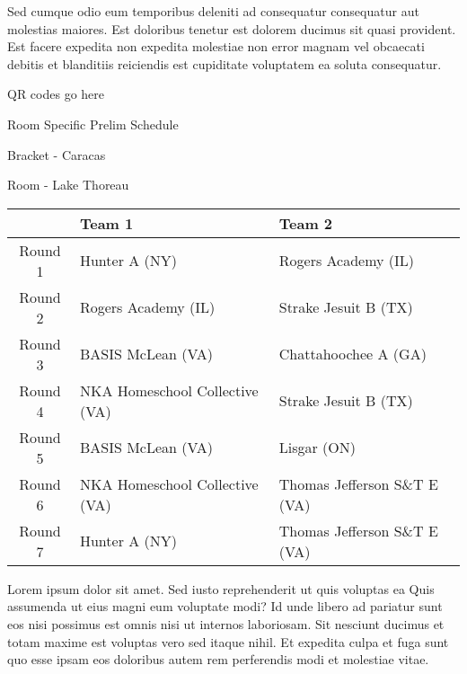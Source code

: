 \documentclass{article}%
\begin{document}
\newline%
Sed cumque odio eum temporibus deleniti ad consequatur consequatur aut molestias maiores. Est doloribus tenetur est dolorem ducimus sit quasi provident. Est facere expedita non expedita molestiae non error magnam vel obcaecati debitis et blanditiis reiciendis est cupiditate voluptatem ea soluta consequatur.%
\vspace*{140pt}%
\begin{center}%
\begin{Huge}%
QR codes go here%
\end{Huge}%
\end{center}%
\newpage%
\begin{center}%
\begin{Huge}%
Room Specific Prelim Schedule%
\end{Huge}%
\vspace*{8pt}%
\linebreak%
\begin{Large}%
Bracket {-} Caracas%
\end{Large}%
\vspace*{8pt}%
\linebreak%
\vspace*{8pt}%
\begin{Large}%
Room {-} Lake Thoreau%
\end{Large}%
\end{center}%
%
\begin{tabularx}{\textwidth}{|c|Y|Y|}%
\hline%
&Team 1&Team 2\\%
\hline%
Round 1&Hunter A (NY)&Rogers Academy (IL)\\%
Round 2&Rogers Academy (IL)&Strake Jesuit B (TX)\\%
Round 3&BASIS McLean (VA)&Chattahoochee A (GA)\\%
Round 4&NKA Homeschool Collective (VA)&Strake Jesuit B (TX)\\%
Round 5&BASIS McLean (VA)&Lisgar (ON)\\%
Round 6&NKA Homeschool Collective (VA)&Thomas Jefferson S\&T E (VA)\\%
Round 7&Hunter A (NY)&Thomas Jefferson S\&T E (VA)\\%
\hline%
\end{tabularx}%
\vspace*{8pt}%
\newline%
Lorem ipsum dolor sit amet. Sed iusto reprehenderit ut quis voluptas ea Quis assumenda ut eius magni eum voluptate modi? Id unde libero ad pariatur sunt eos nisi possimus est omnis nisi ut internos laboriosam. Sit nesciunt ducimus et totam maxime est voluptas vero sed itaque nihil. Et expedita culpa et fuga sunt quo esse ipsam eos doloribus autem rem perferendis modi et molestiae vitae.\newline%
\end{document}
